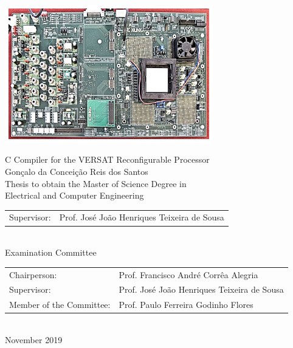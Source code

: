 \begin{center}
%
\vspace{0.5cm}
\includegraphics[height=60mm]{Figures/fpga.jpg}

\vspace{0.8cm}
{\FontLb C Compiler for the VERSAT Reconfigurable Processor} \\
\vspace{3.6cm}
{\FontMb Gonçalo da Conceição Reis dos Santos} \\
\vspace{1.9cm}
{\FontLn Thesis to obtain the Master of Science Degree in} \\
\vspace{0.3cm}
{\FontLb Electrical and Computer Engineering} \\
\vspace{1.0cm}
{\FontSn %
\begin{tabular}{ll}
Supervisor: & Prof. José João Henriques Teixeira de Sousa
\end{tabular} } \\
\vspace{1.0cm}
{\FontMb Examination Committee} \\
\vspace{0.3cm}
{\FontSn %
\begin{tabular}{ll}
Chairperson: & Prof. Francisco André Corrêa Alegria\\
Supervisor: & Prof. José João Henriques Teixeira de Sousa \\
Member of the Committee: & Prof. Paulo Ferreira Godinho Flores \\
\end{tabular} } \\
\vspace{1.5cm}
{\FontMb November 2019} \\
%
\end{center}

\cleardoublepage
